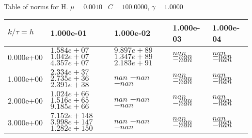 \begin{center}
Table of norms for H. $\mu = 0.0010$ \, $C = 100.0000$, $\gamma = 1.0000$
  
\begin{tabular}{|p{1in}|p{1in}|p{1in}|p{1in}|p{1in}|} \hline
$k / \tau = h$ &1.000e-01 &1.000e-02 &1.000e-03 &1.000e-04 \\ \hline 
0.000e+00 & $1.584e+07$  $1.042e+07$  $4.357e+07$  & $9.897e+89$  $1.347e+89$  $2.183e+91$  & $nan$  $-nan$  $-nan$  & $nan$  $-nan$  $-nan$  \\ \hline 
1.000e+00 & $2.334e+37$  $2.735e+36$  $2.391e+38$  & $nan$  $-nan$  $-nan$  & $nan$  $-nan$  $-nan$  & $nan$  $-nan$  $-nan$  \\ \hline 
2.000e+00 & $1.024e+66$  $1.516e+65$  $9.185e+66$  & $nan$  $-nan$  $-nan$  & $nan$  $-nan$  $-nan$  & $nan$  $-nan$  $-nan$  \\ \hline 
3.000e+00 & $7.152e+148$  $3.998e+147$  $1.282e+150$  & $nan$  $-nan$  $-nan$  & $nan$  $-nan$  $-nan$  & $nan$  $-nan$  $-nan$  \\ \hline 

\end{tabular}\\[20pt]
\end{center}
